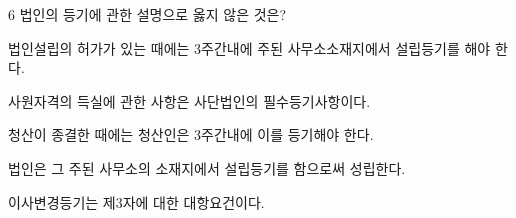 \begin{question}{6}
법인의 등기에 관한 설명으로 옳지 않은 것은?
\begin{choices}
  \item 법인설립의 허가가 있는 때에는 3주간내에 주된 사무소소재지에서 설립등기를 해야 한다.
  \item 사원자격의 득실에 관한 사항은 사단법인의 필수등기사항이다.
  \item 청산이 종결한 때에는 청산인은 3주간내에 이를 등기해야 한다.
  \item 법인은 그 주된 사무소의 소재지에서 설립등기를 함으로써 성립한다.
  \item 이사변경등기는 제3자에 대한 대항요건이다.
\end{choices}
\end{question}
